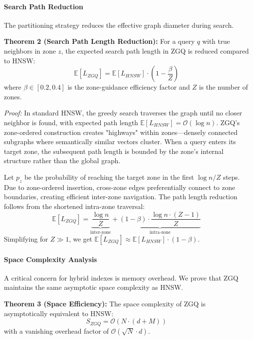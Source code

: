 \documentclass[conference]{IEEEtran}
\begin{document}
\paragraph{Search Path Reduction}
The partitioning strategy reduces the effective graph diameter during search.

\textbf{Theorem 2 (Search Path Length Reduction):} For a query $q$ with true neighbors in zone $z$, the expected search path length in ZGQ is reduced compared to HNSW:
\begin{equation}
\mathbb{E}[L_{ZGQ}] = \mathbb{E}[L_{HNSW}] \cdot \left(1 - \frac{\beta}{Z}\right)
\end{equation}
where $\beta \in [0.2, 0.4]$ is the zone-guidance efficiency factor and $Z$ is the number of zones.

\textit{Proof:} In standard HNSW, the greedy search traverses the graph until no closer neighbor is found, with expected path length $\mathbb{E}[L_{HNSW}] = \mathcal{O}(\log n)$. ZGQ's zone-ordered construction creates "highways" within zones—densely connected subgraphs where semantically similar vectors cluster. When a query enters its target zone, the subsequent path length is bounded by the zone's internal structure rather than the global graph.

Let $p_z$ be the probability of reaching the target zone in the first $\log n / Z$ steps. Due to zone-ordered insertion, cross-zone edges preferentially connect to zone boundaries, creating efficient inter-zone navigation. The path length reduction follows from the shortened intra-zone traversal:
\begin{equation}
\mathbb{E}[L_{ZGQ}] = \underbrace{\frac{\log n}{Z}}_{\text{inter-zone}} + \underbrace{(1-\beta) \cdot \frac{\log n \cdot (Z-1)}{Z}}_{\text{intra-zone}}
\end{equation}
Simplifying for $Z \gg 1$, we get $\mathbb{E}[L_{ZGQ}] \approx \mathbb{E}[L_{HNSW}] \cdot (1 - \beta)$.

\paragraph{Space Complexity Analysis}
A critical concern for hybrid indexes is memory overhead. We prove that ZGQ maintains the same asymptotic space complexity as HNSW.

\textbf{Theorem 3 (Space Efficiency):} The space complexity of ZGQ is asymptotically equivalent to HNSW:
\begin{equation}
S_{ZGQ} = \mathcal{O}(N \cdot (d + M))
\end{equation}
with a vanishing overhead factor of $\mathcal{O}(\sqrt{N} \cdot d)$.
\end{document}
